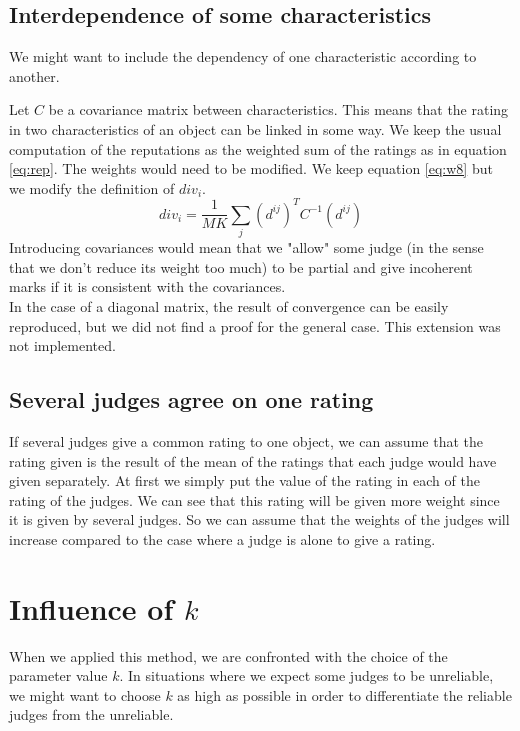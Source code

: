 \documentclass[12pt,a4paper]{article}
\begin{document}
\subsection{Interdependence of some characteristics}
We might want to include the dependency of one characteristic according to another.

Let $C$ be a covariance matrix between characteristics. This means that the rating in two characteristics of an object can be linked in some way. 
We keep the usual computation of the reputations as the weighted sum of the ratings as in equation \ref{eq:rep}. The weights would need to be modified. We keep equation \ref{eq:w8} but we modify the definition of $div_i$.
$$div_i =  \frac{1}{MK}\sum_{j} (d^{ij})^T C^{-1} (d^{ij})$$
Introducing covariances would mean that we "allow" some judge (in the sense that we don't reduce its weight too much) to be partial and give incoherent marks if it is consistent with the covariances.\\
In the case of a diagonal matrix, the result of convergence can be easily reproduced, but we did not find a proof for the general case. This extension was not implemented.


\subsection{Several judges agree on one rating}
If several judges give a common rating to one object, we can assume that the rating given is the result of the mean of the ratings that each judge would have given separately. At first we simply put the value of the rating in each of the rating of the judges. We can see that this rating will be given more weight since it is given by several judges. So we can assume that the weights of the judges will increase compared to the case where a judge is alone to give a rating. 

\section{Influence of $k$}
When we applied this method, we are confronted with the choice of the parameter value $k$. In situations where we expect some judges to be unreliable, we might want to choose $k$ as high as possible in order to differentiate the reliable judges from the unreliable.
\end{document}
